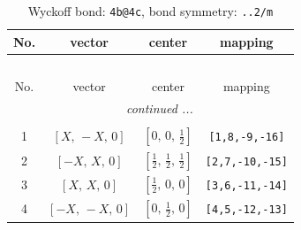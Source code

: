 \documentclass[fleqn,8pt]{jsarticle}
\begin{document}
\begin{longtable}{cccc}
\caption{Wyckoff bond: {\tt 4b@4c}, bond symmetry: {\tt ..2/m}}
 \\
 \hline \hline
No. & vector & center & mapping \\ \hline \endfirsthead

\multicolumn{3}{l}{\tablename\ \thetable{}} \\
 \hline \hline
No. & vector & center & mapping \\ \hline \endhead

 \hline \hline
\multicolumn{3}{r}{\footnotesize\it continued ...} \\ \endfoot

 \hline \hline
\multicolumn{3}{r}{} \\ \endlastfoot

1 & $\left[ X,\, - X,\, 0 \right]$ & $\left[ 0,\, 0,\, \frac{1}{2} \right]$ & {\tt [1,8,-9,-16]} \\ \hline
2 & $\left[ - X,\, X,\, 0 \right]$ & $\left[ \frac{1}{2},\, \frac{1}{2},\, \frac{1}{2} \right]$ & {\tt [2,7,-10,-15]} \\ \hline
3 & $\left[ X,\, X,\, 0 \right]$ & $\left[ \frac{1}{2},\, 0,\, 0 \right]$ & {\tt [3,6,-11,-14]} \\ \hline
4 & $\left[ - X,\, - X,\, 0 \right]$ & $\left[ 0,\, \frac{1}{2},\, 0 \right]$ & {\tt [4,5,-12,-13]} \\
\end{longtable}
\renewcommand{\arraystretch}{1.2}
\end{document}
